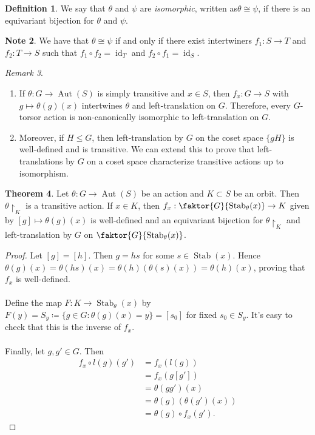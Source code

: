 \documentclass[10pt,letterpaper,cm]{nupset}
\theoremstyle{definition}
\newtheorem{definition}{Definition}[subsection]
\newtheorem{note}[definition]{Note}
\theoremstyle{theorem}
\newtheorem{theorem}[definition]{Theorem}
\theoremstyle{remark}
\newtheorem{remark}[definition]{Remark}
\newcommand{\1}{\mathbf{1}}
\newcommand{\0}{\vec 0}
\DeclareMathOperator{\id}{id}
\DeclareMathOperator{\aut}{Aut}
\DeclareMathOperator{\stab}{Stab}
\begin{document}
\begin{definition}
We say that $\theta$ and $\psi$ are \textit{isomorphic}, written as$\theta \cong \psi$,  if there is an equivariant bijection for $\theta$ and $\psi$.
\end{definition}

\begin{note}
We have that $\theta \cong \psi$ if and only if there exist intertwiners $f_1 : S \to T$ and $f_2 : T \to S$ such that $f_1 \circ f_2 = \id_T$ and $f_2 \circ f_1 = \id_S$. 
\end{note}

\begin{remark} $ $
\begin{enumerate}
\item If $\theta: G \to \aut(S)$ is simply transitive and $x \in S$, then $f_x: G \to S$ with $g \mapsto \theta(g)(x)$ intertwines $\theta$ and left-translation on $G$. Therefore, every $G$-torsor action is non-canonically isomorphic to left-translation on $G$.
\item Moreover, if $H \leq G$, then left-translation by $G$ on the coset space $\{gH\}$ is well-defined and is transitive. We can extend this to prove that left-translations by $G$ on a coset space characterize transitive actions up to isomorphism.
\end{enumerate}
\end{remark}

\begin{theorem}
Let $ \theta: G \to \aut(S)$ be an action and $K \subset S$ be an orbit. Then $\theta \restriction_K$ is a transitive action. If $x \in K$, then $f_x: \faktor{G}{\stab_\theta(x)} \to K$ given by $[g] \mapsto \theta(g)(x)$ is well-defined and an equivariant bijection for $\theta \restriction_K$ and left-translation by $G$ on $\faktor{G}{\stab_\theta(x)}$.
\end{theorem}

\begin{proof}
Let $[g] = [h]$. Then $g = hs$ for some $s \in \stab(x)$. Hence $\theta(g)(x) = \theta(hs)(x) = \theta(h)(\theta(s)(x)) = \theta(h)(x)$, proving that $f_x$ is well-defined. \\  \\
Define the map $F: K \to \stab_\theta(x)$ by $F(y) = S_y \coloneqq  \{g \in G : \theta(g)(x) = y\} = [s_0]$ for fixed $s_0 \in S_y$.
It's easy to check that this is the inverse of $f_x$. 
\\ \\
Finally, let $g, g'\in G$. Then 
\begin{align*} f_x \circ l(g)(g') & = f_x(l(g)) \\ & = f_x(g[g'])  \\ & = \theta(gg')(x) 
 \\ & = \theta(g)(\theta(g')(x))\\ &  = \theta(g) \circ f_x(g').
\end{align*}
\end{proof}
\end{document}
